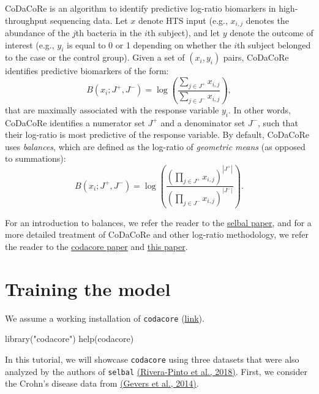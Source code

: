 \documentclass[
]{article}
\newenvironment{Shaded}{\begin{snugshade}}{\end{snugshade}}
\newcommand{\FunctionTok}[1]{\textcolor[rgb]{0.00,0.00,0.00}{#1}}
\newcommand{\NormalTok}[1]{#1}
\newcommand{\StringTok}[1]{\textcolor[rgb]{0.31,0.60,0.02}{#1}}
\begin{document}
CoDaCoRe is an algorithm to identify predictive log-ratio biomarkers in
high-throughput sequencing data. Let \(x\) denote HTS input (e.g.,
\(x_{i,j}\) denotes the abundance of the \(j\)th bacteria in the \(i\)th
subject), and let \(y\) denote the outcome of interest (e.g., \(y_i\) is
equal to 0 or 1 depending on whether the \(i\)th subject belonged to the
case or the control group). Given a set of \((x_i, y_i)\) pairs,
CoDaCoRe identifies predictive biomarkers of the form: \[
B(x_i; J^+, J^-) = \log \left( \frac{\sum_{j \in J^+} x_{i,j}}{\sum_{j \in J^-} x_{i,j}} \right),
\] that are maximally associated with the response variable \(y_i\). In
other words, CoDaCoRe identifies a numerator set \(J^+\) and a
denominator set \(J^-\), such that their log-ratio is most predictive of
the response variable. By default, CoDaCoRe uses \emph{balances}, which
are defined as the log-ratio of \emph{geometric means} (as opposed to
summations): \[
B(x_i; J^+, J^-) = \log \left( \frac{(\prod_{j \in J^+} x_{i,j})^{|J^+|}}{(\prod_{j \in J^-} x_{i,j})^{|J^-|}} \right).
\]

For an introduction to balances, we refer the reader to the
\href{https://journals.asm.org/doi/abs/10.1128/msystems.00053-18}{selbal
paper}, and for a more detailed treatment of CoDaCoRe and other
log-ratio methodology, we refer the reader to the
\href{https://doi.org/10.1093/bioinformatics/btab645}{codacore paper}
and \href{https://arxiv.org/abs/2104.07266}{this paper}.

\hypertarget{training-the-model}{%
\section{Training the model}\label{training-the-model}}

We assume a working installation of \texttt{codacore}
(\href{https://github.com/egr95/R-codacore/blob/main/README.md}{link}).

\begin{Shaded}
\begin{Highlighting}[]
\FunctionTok{library}\NormalTok{(}\StringTok{"codacore"}\NormalTok{)}
\FunctionTok{help}\NormalTok{(codacore)}
\end{Highlighting}
\end{Shaded}

In this tutorial, we will showcase \texttt{codacore} using three
datasets that were also analyzed by the authors of \texttt{selbal}
\href{https://journals.asm.org/doi/abs/10.1128/msystems.00053-18}{(Rivera-Pinto
et al., 2018)}. First, we consider the Crohn's disease data from
\href{http://dx.doi.org/10.1016/j.chom.2014.02.005}{(Gevers et al.,
2014)}.
\end{document}
